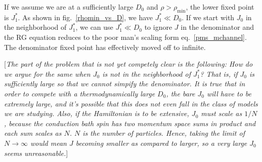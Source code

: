 \documentclass{revtex4-2}
\numberwithin{equation}{section}
\begin{document}
If we assume we are at a sufficiently large \(D_0\) and \(\rho > \rho_\text{min}\), the lower fixed point is \(J_1^*\). As shown in fig.~\ref{rhomin_vs_D}, we have \(J_1^* \ll D_0\). If we start with \(J_0\) in the neighborhood of \(J_1^*\), we can use \(J_1^* \ll D_0\) to ignore \(J\) in the denominator and the RG equation reduces to the poor man's scaling form eq.~\ref{pms_mchannel}. The denominator fixed point has effectively moved off to infinite.

[\textit{The part of the problem that is not yet competely clear is the following: How do we argue for the same when \(J_0\) is not in the neighborhood of \(J_1^*\)? That is, if \(J_0\) is sufficiently large so that we cannot simpify the denominator. It is true that in order to compete with a thermodynamically large \(D_0\), the bare \(J_0\) will have to be extremely large, and it's possible that this does not even fall in the class of models we are studying. Also, if the Hamiltonian is to be extensive, \(J_0\) must scale as \(1/N\), because the conduction bath spin has two momentum space sums in product and each sum scales as \(N\). \(N\) is the number of particles. Hence, taking the limit of \(N \to \infty\) would mean \(J\) becoming smaller as compared to larger, so a very large \(J_0\) seems unreasonable.}]
\end{document}
